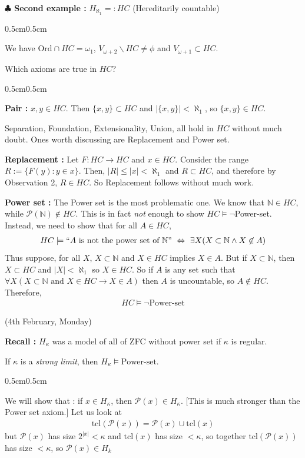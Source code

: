 \documentclass[12pt,a4paper]{article}
\newenvironment{proof}
{\begin{changemargin}{0.5cm}{0.5cm} 
	}%
	{\end{changemargin}
}
\newenvironment{subproof}
{\begin{changemargin}{0.5cm}{0.5cm} 
	}%
	{\end{changemargin}
}
\newenvironment{p}
{\begin{proof} 
	}%
	{\end{proof}
}
\begin{document}
\textbf{$\clubsuit$ Second example :} $H_{\aleph_1} =: HC$ (Hereditarily countable)
\begin{subproof}
We have $\text{Ord} \cap HC = \omega_1$, $V_{\omega +2} \backslash HC \neq \phi$ and $V_{\omega+1}\subset HC$.

\quad Which axioms are true in $HC$?
\begin{subproof}
\textbf{Pair :} $x,y\in HC$. Then $\{x,y\} \subset HC$ and $|\{x,y\}| < \aleph_1$, so $\{x,y\}\in HC$.

\quad Separation, Foundation, Extensionality, Union, all hold in $HC$ without much doubt. Ones worth discussing are Replacement and Power set.
\s

\textbf{Replacement :} Let $F: HC \rightarrow HC$ and $x\in HC$. Consider the range $R:= \{F(y) : y\in x\}$. Then, $|R| \leq |x| < \aleph_1$ and $R\subset HC$, and therefore by Observation 2, $R\in HC$. So Replacement follows without much work.
\s

\textbf{Power set :} The Power set is the most problematic one. We know that $\mathbb{N} \in HC$, while $\mathscr{P}(\mathbb{N}) \not\in HC$. This is in fact \emph{not} enough to show $HC \models \neg$Power-set. Instead, we need to show that for all $A\in HC$,
\begin{align*}
HC\models ``A\text{ is not the power set of }\mathbb{N}" \,\, \Leftrightarrow \,\, \exists X(X\subset \mathbb{N} \wedge X\not\in A)
\end{align*}
Thus suppose, for all $X$, $X\subset \mathbb{N}$ and $X\in HC$ implies $X\in A$. But if $X\subset \mathbb{N}$, then $X\subset HC$ and $|X| < \aleph_1$ so $X\in HC$. So if $A$ is any set such that $\forall X(X\subset \mathbb{N} \text{ and } X\in HC \rightarrow X\in A)$ then $A$ is uncountable, so $A\not\in HC$. Therefore,
\begin{align*}
HC \models \neg \text{Power-set}
\end{align*}  
\end{subproof}
\end{subproof}
\s

\newday

(4th February, Monday)
\s

\textbf{Recall :} $H_{\kappa}$ was a model of all of ZFC without power set if $\kappa$ is regular.
\s

\prop If $\kappa$ is a \emph{strong limit}, then $H_{\kappa} \models \text{Power-set}$.
\begin{p}
\pf We will show that : if $x\in H_{\kappa}$, then $\mathscr{P}(x) \in H_{\kappa}$. [This is much stronger than the Power set axiom.] Let us look at
\begin{align*}
\text{tcl}(\mathscr{P}(x)) = \mathscr{P}(x) \cup \text{tcl}(x)
\end{align*}
but $\mathscr{P}(x)$ has size $2^{|x|}< \kappa$ and $\text{tcl}(x)$ has size $< \kappa$, so together $\text{tcl}(\mathscr{P}(x))$ has size $<\kappa$, so $\mathscr{P}(x) \in H_k$

\eop
\end{p} 
\s
\end{document}
